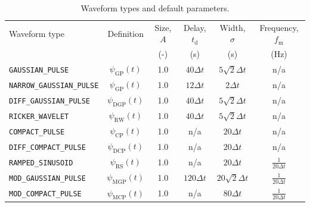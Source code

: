 \documentclass[onecolumn,a4paper]{article}
\numberwithin{equation}{section}
\begin{document}
\begin{table}[ht]
\begin{center}
\begin{tabular}{|l|c|c|c|c|c|}\hline
Waveform type                     &Definition             &Size, $A$ &Delay, $t_\mathrm{d}$ &Width, $\sigma$      &Frequency, $f_\mathrm{m}$ \\ 
{ }                               &{ }                    &(-)       &(s)                   &(s)                  &(Hz)                      \\ \hline
\texttt{GAUSSIAN\_PULSE}          &$\psi_\mathrm{GP}(t)$  &1.0       &$40\Delta t$          &$5\sqrt{2}\Delta t$  &n/a                       \\
\texttt{NARROW\_GAUSSIAN\_PULSE}  &$\psi_\mathrm{GP}(t)$  &1.0       &$12\Delta t$          &$2\Delta t$          &n/a                       \\
\texttt{DIFF\_GAUSSIAN\_PULSE}    &$\psi_\mathrm{DGP}(t)$ &1.0       &$40\Delta t$          &$5\sqrt{2}\Delta t$  &n/a                       \\
\texttt{RICKER\_WAVELET}          &$\psi_\mathrm{RW}(t)$  &1.0       &$40\Delta t$          &$5\sqrt{2}\Delta t$  &n/a                       \\
\texttt{COMPACT\_PULSE}           &$\psi_\mathrm{CP}(t)$  &1.0       &n/a                   &$20\Delta t$         &n/a                       \\
\texttt{DIFF\_COMPACT\_PULSE}     &$\psi_\mathrm{DCP}(t)$ &1.0       &n/a                   &$20\Delta t$         &n/a                       \\
\texttt{RAMPED\_SINUSOID}         &$\psi_\mathrm{RS}(t)$  &1.0       &n/a                   &$20\Delta t$         &$\frac{1}{20\Delta t}$    \\
\texttt{MOD\_GAUSSIAN\_PULSE}     &$\psi_\mathrm{MGP}(t)$ &1.0       &$120\Delta t$         &$20\sqrt{2}\Delta t$ &$\frac{1}{20\Delta t}$    \\
\texttt{MOD\_COMPACT\_PULSE}      &$\psi_\mathrm{MCP}(t)$ &1.0       &n/a                   &$80\Delta t$         &$\frac{1}{20\Delta t}$    \\
\hline
\end{tabular}
\caption{\label{tb:wf}Waveform types and default parameters.}
\end{center}
\end{table}
\end{document}
